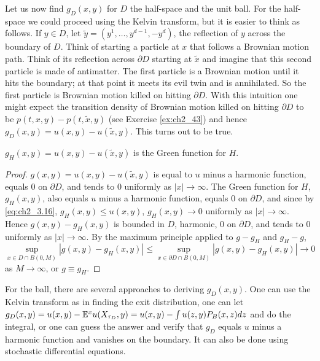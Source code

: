 

Let us now find $g_D(x,y)$ for $D$ the half-space and the unit ball. For the half-space we could proceed using the Kelvin transform, but it is easier to think as follows. If $y \in D$, let $\widetilde{y} = (y^1,\ldots,y^{d-1},-y^d)$, the reflection of $y$ across the boundary of $D$. Think of starting a particle at $x$ that follows a Brownian motion path. Think of its reflection across $\partial D$ starting at $\widetilde{x}$ and imagine that this second particle is made of antimatter. The first particle is a Brownian motion until it hits the boundary; at that point it meets its evil twin and is annihilated. So the first particle is Brownian motion killed on hitting $\partial D$. With this intuition one might expect the transition density of Brownian motion killed on hitting $\partial D$ to be $p(t,x,y) - p(t,\widetilde{x},y)$ (see Exercise \ref{ex:ch2_43}) and hence $g_D(x,y) = u(x,y) - u(\widetilde{x},y)$. This turns out to be true.

\begin{proposition}\label{prop:ch2_3.8}
$g_H(x,y) = u(x,y) - u(\widetilde{x},y)$ is the Green function for $H$.
\end{proposition}

\begin{proof}
$g(x,y) = u(x,y) - u(\widetilde{x},y)$ is equal to $u$ minus a harmonic function, equals $0$ on $\partial D$, and tends to $0$ uniformly as $|x| \to \infty$. The Green function for $H$, $g_H(x,y)$, also equals $u$ minus a harmonic function, equals $0$ on $\partial D$, and since by \eqref{eq:ch2_3.16}, $g_H(x,y) \leq u(x,y)$, $g_H(x,y) \to 0$ uniformly as $|x| \to \infty$. Hence $g(x,y) - g_H(x,y)$ is bounded in $D$, harmonic, $0$ on $\partial D$, and tends to $0$ uniformly as $|x| \to \infty$. By the maximum principle applied to $g-g_H$ and $g_H-g$,
\[
    \sup_{x\in D\cap B(0,M)} |g(x,y) - g_H(x,y)| \leq \sup_{x\in\partial D\cap B(0,M)} |g(x,y) - g_H(x,y)| \to 0
\]
as $M \to \infty$, or $g \equiv g_H$.
\end{proof}


For the ball, there are several approaches to deriving $g_D(x,y)$. One can use the Kelvin transform as in finding the exit distribution, one can let $g_D(x,y) = u(x,y) - \mathbb{E}^xu(X_{\tau_D},y) = u(x,y) - \int u(z,y)P_B(x,z)dz$ and do the integral, or one can guess the answer and verify that $g_D$ equals $u$ minus a harmonic function and vanishes on the boundary. It can also be done using stochastic differential equations.

